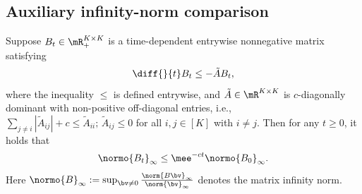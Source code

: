 \documentclass[11pt]{article}
\begin{document}
\subsection{Auxiliary infinity-norm comparison}
\label{app:InfCtrl}

\begin{lem}
\label{lem:InfCtrl}
Suppose $B_t \in \mR_+^{K\times K}$ is a time-dependent entrywise nonnegative matrix satisfying
\begin{equation}
    \diff{}{t} B_t \le - \tilde{A} B_t,
\end{equation}
where the inequality $\le$ is defined entrywise, and $\tilde{A} \in \mR^{K\times K}$ is $c$-diagonally dominant with non-positive off-diagonal entries, i.e.,
\(
    \sum_{j\neq i} |\tilde{A}_{ij}| + c \le \tilde{A}_{ii};\, \tilde{A}_{ij} \le 0
\)
for all $ i,j \in [K]$ with $i\neq j$. Then for any $t\ge 0$, it holds that
\begin{equation}
    \normo{B_t}_\infty \le \mee^{-c t} \normo{B_0}_\infty.
\end{equation}
Here $\normo{B}_\infty := \sup_{\bv\neq 0} \frac{\norm{B\bv}_\infty }{ \norm{\bv}_\infty }$ denotes the matrix infinity norm.
\end{lem}
\end{document}
